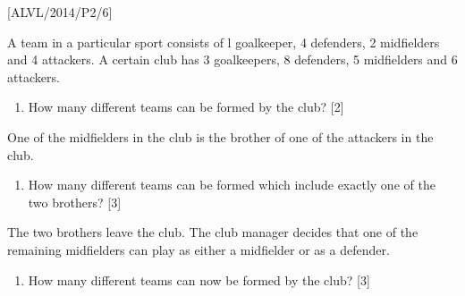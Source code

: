 \item {[}ALVL/2014/P2/6{]}

A team in a particular sport consists of l goalkeeper, 4 defenders,
2 midfielders and 4 attackers. A certain club has 3 goalkeepers, 8
defenders, 5 midfielders and 6 attackers.
\begin{enumerate}
\item How many different teams can be formed by the club?\hfill{} {[}2{]}
\end{enumerate}
One of the midfielders in the club is the brother of one of the attackers
in the club.
\begin{enumerate}
\item How many different teams can be formed which include exactly one of
the two brothers?\hfill{} {[}3{]}
\end{enumerate}
The two brothers leave the club. The club manager decides that one
of the remaining midfielders can play as either a midfielder or as
a defender.
\begin{enumerate}
\item How many different teams can now be formed by the club? \hfill{}{[}3{]}
\end{enumerate}
